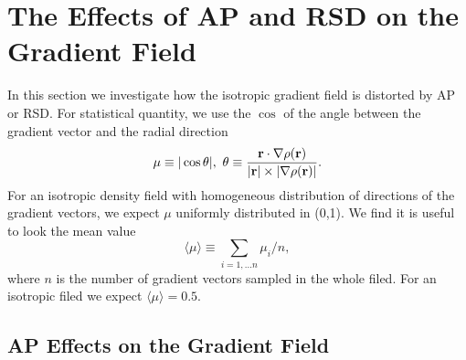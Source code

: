 \documentclass{emulateapj}
\begin{document}
\section{The Effects of AP and RSD on the Gradient Field}

In this section we investigate how the isotropic gradient field is distorted by AP or RSD.
For statistical quantity, we use the $\cos$ of the angle between the gradient vector and the radial direction
\begin{equation}
 \mu\equiv |\cos \theta|,\ \theta\equiv \frac{{\bf r}\cdot\nabla\rho({\bf r})}{|{\bf r}|\times|\nabla\rho({\bf r})|}.
\end{equation}
For an isotropic density field with homogeneous distribution of directions of the gradient vectors,
we expect $\mu$ uniformly distributed in (0,1).
We find it is useful to look the mean value
\begin{equation}
 \langle\mu\rangle \equiv {\sum_{i=1,... n} \mu_i}/n,
\end{equation}
where $n$ is the number of gradient vectors sampled in the whole filed.
For an isotropic filed we expect $\langle\mu\rangle=0.5$.

\subsection{AP Effects on the Gradient Field}
\end{document}
